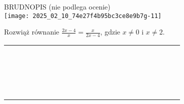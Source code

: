 \documentclass[10pt]{article}
\begin{document}
BRUDNOPIS (nie podlega ocenie)\\
\texttt{[image: 2025\_02\_10\_74e27f4b95bc3ce8e9b7g-11]}

Rozwiąż równanie \(\frac{2 x-4}{x}=\frac{x}{2 x-4}\), gdzie \(x \neq 0\) i \(x \neq 2\).

\begin{center}
\begin{tabular}{|c|c|c|c|c|c|c|c|c|c|c|c|c|c|c|c|c|c|c|c|c|c|}
\hline
 &  &  &  &  &  &  &  &  &  &  &  &  &  &  &  &  &  &  &  &  &  \\
\hline
 &  &  &  &  &  &  &  &  &  &  &  &  &  &  &  &  &  &  &  &  &  \\
\hline
 &  &  &  &  &  &  &  &  &  &  &  &  &  &  &  &  &  &  &  &  &  \\
\hline
 &  &  &  &  &  &  &  &  &  &  &  &  &  &  &  &  &  &  &  &  &  \\
\hline
 &  &  &  &  &  &  &  &  &  &  &  &  &  &  &  &  &  &  &  &  &  \\
\hline
 &  &  &  &  &  &  &  &  &  &  &  &  &  &  &  &  &  &  &  &  &  \\
\hline
 &  &  &  &  &  &  &  &  &  &  &  &  &  &  &  &  &  &  &  &  &  \\
\hline
 &  &  &  &  &  &  &  &  &  &  &  &  &  &  &  &  &  &  &  &  &  \\
\hline
 &  &  &  &  &  &  &  &  &  &  &  &  &  &  &  &  &  &  &  &  &  \\
\hline
 &  &  &  &  &  &  &  &  &  &  &  &  &  &  &  &  &  &  &  &  &  \\
\hline
 &  &  &  &  &  &  &  &  &  &  &  &  &  &  &  &  &  &  &  &  &  \\
\hline
 &  &  &  &  &  &  &  &  &  &  &  &  &  &  &  &  &  &  &  &  &  \\
\hline
 &  &  &  &  &  &  &  &  &  &  &  &  &  &  &  &  &  &  &  &  &  \\
\hline
 &  &  &  &  &  &  &  &  &  &  &  &  &  &  &  &  &  &  &  &  &  \\
\hline
 &  &  &  &  &  &  &  &  &  &  &  &  &  &  &  &  &  &  &  &  &  \\
\hline
 &  &  &  &  &  &  &  &  &  &  &  &  &  &  &  &  &  &  &  &  &  \\
\hline
 &  &  &  &  &  &  &  &  &  &  &  &  &  &  &  &  &  &  &  &  &  \\
\hline
 &  &  &  &  &  &  &  &  &  &  &  &  &  &  &  &  &  &  &  &  &  \\
\hline
 &  &  &  &  &  &  &  &  &  &  &  &  &  &  &  &  &  &  &  &  &  \\

\end{tabular}
\end{center}
\end{document}
